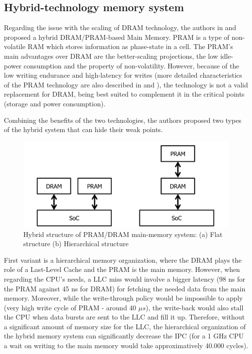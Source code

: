 \documentclass[10pt,journal,compsoc]{IEEEtran}
\begin{document}
\subsection{Hybrid-technology memory system}
Regarding the issue with the scaling of DRAM technology, the authors in \cite{PDRAM} and \cite{PRAM} proposed a hybrid DRAM/PRAM-based Main Memory. PRAM is a type of non-volatile RAM which stores information as phase-state in a cell. The PRAM’s main advantages over DRAM  are the better-scaling projections, the low idle-power consumption and the property of non-volatility. However, because of the low writing endurance and high-latency for writes (more detailed characteristics of the PRAM technology are also described in \cite{PDRAM} and \cite{PRAM}), the technology is not a valid replacement for DRAM, being best suited to complement it in the critical points (storage and power consumption).

Combining the benefits of the two technologies, the authors proposed two types of the hybrid system that can hide their weak points. 
\begin{figure}
	\centering
	\includegraphics[width = 8 cm]{graphics/structure-hybrid.png}
	\caption{Hybrid structure of PRAM/DRAM main-memory system: (a) Flat structure (b) Hierarchical structure \cite{PRAM}}\label{fig:structure}
\end{figure} 
First variant is a hierarchical memory organization, where the DRAM plays the role of a Last-Level Cache and the PRAM is the main memory. However, when regarding the CPU’s needs, a LLC miss would involve a bigger latency (98 ns for the PRAM against 45 ns for DRAM) for fetching the needed data from the main memory. Moreover, while the write-through policy would be impossible to apply (very high write cycle of PRAM - around 40 $\mu s$), the write-back would also stall the CPU when data bursts are sent to the LLC and fill it up. Therefore, without a significant amount of memory size for the LLC, the hierarchical organization of the hybrid memory system can significantly decrease the IPC (for a 1 GHz CPU a wait on writing to the main memory would take approximatively 40.000 cycles).
\end{document}
